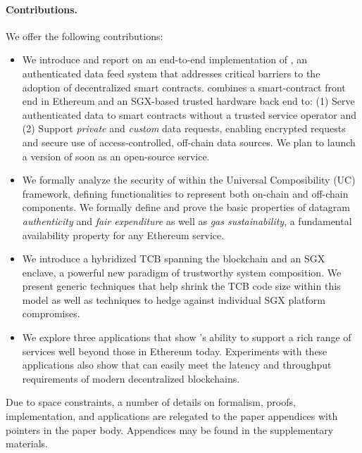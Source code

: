 \paragraph{\bf Contributions.}
We offer the following contributions:
\begin{itemize}[leftmargin=5mm]
\item
  \setlength{\itemsep}{2pt}
  \setlength{\parskip}{0pt}
  \setlength{\parsep}{0pt}
We introduce and report on an end-to-end implementation of \tcs, an authenticated data feed system that addresses critical barriers to the adoption of decentralized smart contracts. \tc combines a smart-contract front end in Ethereum and an SGX-based trusted hardware back end to: (1) Serve authenticated data to smart contracts without a trusted service operator and (2) Support {\em private} and {\em custom} data requests, enabling encrypted requests and secure use of access-controlled, off-chain data sources. We plan to launch a version of \tc soon as an open-source service.
\item We formally analyze the security of \tc within the Universal Composibility (UC) framework, defining functionalities to represent both on-chain and off-chain components. We formally define and prove the basic properties of datagram {\em authenticity} and {\em fair expenditure} as well as {\em gas sustainability}, a fundamental availability property for any Ethereum service. 
\item We introduce a hybridized TCB spanning the blockchain and an SGX enclave, a powerful new paradigm of trustworthy system composition. We present generic techniques that help shrink the TCB code size within this model as well as techniques to hedge against individual SGX platform compromises. 
\item We explore three \tc applications that show \tc's ability to support a rich range of services well beyond those in Ethereum today. Experiments with these applications also show that \tc can easily meet the latency and throughput requirements of modern decentralized blockchains. 

\end{itemize}

Due to space constraints, a number of details on formalism, proofs, implementation, and applications are relegated to the paper appendices with pointers in the paper body. Appendices may be found in the supplementary materials. 

